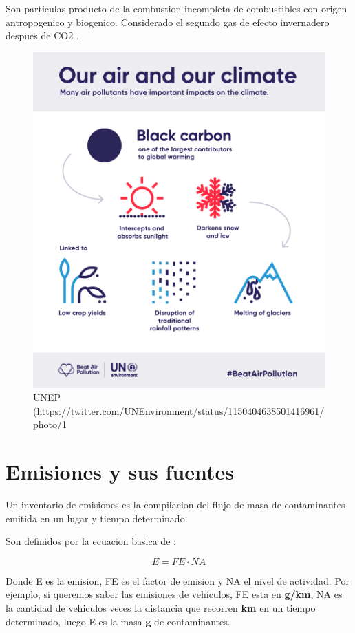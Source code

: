 \documentclass[]{book}
\begin{document}
Son particulas producto de la combustion incompleta de combustibles con origen antropogenico y biogenico.
Considerado el segundo gas de efecto invernadero despues de CO2 \citep{bond2013bounding}.

\begin{figure}
\includegraphics[width=0.9\linewidth]{figs/bc} \caption{UNEP (https://twitter.com/UNEnvironment/status/1150404638501416961/photo/1}\label{fig:unnamed-chunk-20}
\end{figure}

\hypertarget{emisiones-y-sus-fuentes}{%
\section{Emisiones y sus fuentes}\label{emisiones-y-sus-fuentes}}

Un inventario de emisiones es la compilacion del flujo de masa de contaminantes emitida en un lugar y tiempo determinado.

Son definidos por la ecuacion basica de :

\begin{equation}
E = FE \cdot NA
\label{eq:12}
\end{equation}

Donde E es la emision, FE es el factor de emision y NA el nivel de actividad. Por ejemplo, si queremos saber las emisiones de vehiculos, FE esta en \textbf{g/km}, NA es la cantidad de vehiculos veces la distancia que recorren \textbf{km} en un tiempo determinado, luego E es la masa \textbf{g} de contaminantes.
\end{document}
